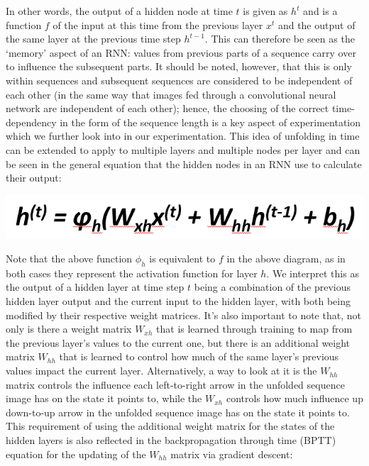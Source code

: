 \documentclass[12pt,twoside]{report}
\begin{document}
\quad In other words, the output of a hidden node at time $t$ is given as $h^{t}$ and is a function $f$ of the input at this time from the previous layer $x^t$ and the output of the same layer at the previous time step $h^{t-1}$. This can therefore be seen as the ‘memory’ aspect of an RNN: values from previous parts of a sequence carry over to influence the subsequent parts. It should be noted, however, that this is only within sequences and subsequent sequences are considered to be independent of each other (in the same way that images fed through a convolutional neural network are independent of each other); hence, the choosing of the correct time-dependency in the form of the sequence length is a key aspect of experimentation which we further look into in our experimentation. This idea of unfolding in time can be extended to apply to multiple layers and multiple nodes per layer and can be seen in the general equation that the hidden nodes in an RNN use to calculate their output:\\

\begin{center}
\includegraphics[scale=0.4]{project_figures/fig3_3}
\end{center}

\quad Note that the above function $\phi_h$ is equivalent to $f$ in the above diagram, as in both cases they represent the activation function for layer $h$. We interpret this as the output of a hidden layer at time step $t$ being a combination of the previous hidden layer output and the current input to the hidden layer, with both being modified by their respective weight matrices. It’s also important to note that, not only is there a weight matrix $W_{xh}$ that is learned through training to map from the previous layer’s values to the current one, but there is an additional weight matrix $W_{hh}$ that is learned to control how much of the same layer’s previous values impact the current layer. Alternatively, a way to look at it is the $W_{hh}$ matrix controls the influence each left-to-right arrow in the unfolded sequence image has on the state it points to, while the $W_{xh}$ controls how much influence up down-to-up arrow in the unfolded sequence image has on the state it points to.\\

\quad This requirement of using the additional weight matrix for the states of the hidden layers is also reflected in the backpropagation through time (BPTT) equation for the updating of the $W_{hh}$ matrix via gradient descent:\\
\end{document}
